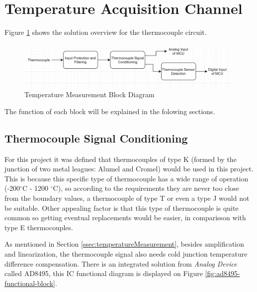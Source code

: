 \section{Temperature Acquisition Channel}\label{sec:temperatura-acquisition-channel}
	
	Figure \ref{fig:temperature-measurement-block-diagram} shows the solution overview for the thermocouple circuit.

	\begin{figure}[htbp]
		\centering
		\includegraphics[width=1\textwidth]{figuras/fig-temperature-measurement-block-diagram}
		\caption{Temperature Measurement Block Diagram}
		\label{fig:temperature-measurement-block-diagram}
	\end{figure}

	The function of each block will be explained in the folowing sections.
	
	\subsection{Thermocouple Signal Conditioning}\label{ssec:thermocouple-signal-conditioning}
		
		For this project it was defined that thermocouples of type K (formed by the junction of two metal leagues: Alumel and Cromel) would be used in this project. This is because this specific type of thermocouple has a wide range of operation (-200$^{\circ}$C - 1200 $^{\circ}$C), so according to the requirements they are never too close from the boundary values, a thermocouple of type T or even a type J would not be suitable. Other appealing factor is that this type of thermocouple is quite common so getting eventual replacements would be easier, in comparisson with type E thermocouples.
		\par
		As mentioned in Section \ref{ssec:temperatureMeasurement}, besides amplification and linearization, the thermocouple signal also needs cold junction temperature difference compensation. There is an integrated solution from \textit{Analog Device} called AD8495, this IC functional diagram is displayed on Figure \ref{fig:ad8495-functional-block}.
		
